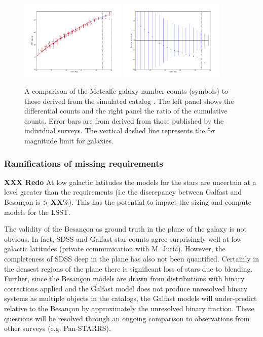 \documentclass[]{article}
\begin{document}
{\begin{figure}[h]
\centering
\includegraphics[width=0.45\textwidth]{validation_figures/Ngals-i.png}
\hfil \includegraphics[width=0.45\textwidth]{validation_figures/CumulativeFraction_i.png}
\caption{A comparison of the Metcalfe galaxy number counts (symbols)
  to those derived from the simulated catalog \label{fig:gcounts}. The
  left panel shows the differential counts and the right panel the
  ratio of the cumulative counts. Error bars are from derived from
  those published by the individual surveys. \label{fig:gratio}
The vertical dashed line represents the
  5$\sigma$ magnitude limit for galaxies.}
\end{figure}

\subsubsection{Ramifications of missing requirements}


{\bf XXX Redo}
At low galactic latitudes the models for the stars are uncertain at a
level greater than the requirements (i.e the discrepancy between
Galfast and Besan\c{c}on is > {\bf XX}\%).  This has the potential to
impact the sizing and compute models for the LSST.

The validity of the Besan\c{c}on as ground truth in the plane of the galaxy is not obvious.  In fact, SDSS and Galfast star counts agree surprisingly well at low galactic latitudes (private communication with M. Juri\'{c}). 
However, the completeness of SDSS deep in the plane has also not been quantified.  Certainly in the densest regions
of the plane there is significant loss of stars due to blending.  Further, since the Besan\c{c}on models are drawn
from distributions with binary corrections applied and the Galfast model does not produce unresolved binary systems
as multiple objects in the catalogs, the Galfast models will under-predict relative to the Besan\c{c}on by 
approximately the unresolved binary fraction.  These questions will be resolved through an ongoing comparison to observations
from other surveys (e.g. Pan-STARRS).

}
\end{document}
